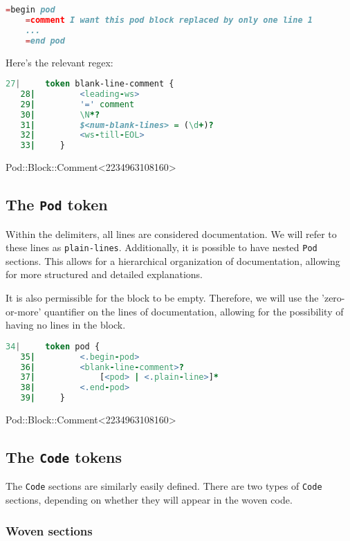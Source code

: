 \documentclass{scrartcl}
\begin{document}
\begin{lstlisting}[language=Raku]
    =begin pod
    =comment I want this pod block replaced by only one line 1
    ...
    =end pod

\end{lstlisting}


Here's the relevant regex:

\begin{lstlisting}[language=Raku]
   27|     token blank-line-comment {
   28|         <leading-ws>
   29|         '=' comment
   30|         \N*?
   31|         $<num-blank-lines> = (\d+)?
   32|         <ws-till-EOL>
   33|     } 

\end{lstlisting}


Pod::Block::Comment<2234963108160>

\subsection{The \texttt{Pod} token}

Within the delimiters, all lines are considered documentation. We will
refer to these lines as \texttt{plain-lines}. Additionally, it is possible
to have nested \texttt{Pod} sections. This allows for a hierarchical
organization of documentation, allowing for more structured and detailed
explanations.

It is also permissible for the block to be empty. Therefore, we will use
the 'zero-or-more' quantifier on the lines of documentation, allowing for
the possibility of having no lines in the block.

\begin{lstlisting}[language=Raku]
   34|     token pod {
   35|         <.begin-pod>
   36|         <blank-line-comment>?
   37|             [<pod> | <.plain-line>]*
   38|         <.end-pod>
   39|     } 

\end{lstlisting}


Pod::Block::Comment<2234963108160>

\subsection{The \texttt{Code} tokens}

The \texttt{Code} sections are similarly easily defined. There are two
types of \texttt{Code} sections, depending on whether they will appear in
the woven code.

\subsubsection{Woven sections}
\end{document}
